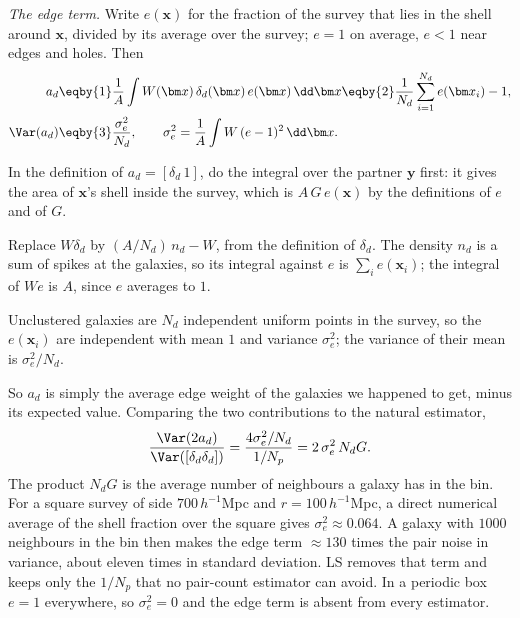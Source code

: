 \emph{The edge term.} Write $e(\bm x)$ for the fraction of the survey that lies in
the shell around $\bm x$, divided by its average over the survey; $e=1$ on
average, $e<1$ near edges and holes. Then
\begin{align}
  a_d&\eqby{1}\frac{1}{A}\int W(\bm x)\,\delta_d(\bm x)\,e(\bm x)\,\dd\bm x
     \eqby{2}\frac{1}{N_d}\sum_{i=1}^{N_d}e(\bm x_i)-1,\nonumber\\
  \Var(a_d)&\eqby{3}\frac{\sigma_e^2}{N_d},
  \qquad \sigma_e^2=\frac1A\int W\,(e-1)^2\,\dd\bm x .
  \label{11a:eq:ad-variance}
\end{align}
\begin{explain}
  \item In the definition of $a_d=[\delta_d\,1]$, do the integral over the partner
        $\bm y$ first: it gives the area of $\bm x$'s shell inside the survey,
        which is $A\,G\,e(\bm x)$ by the definitions of $e$ and of $G$.
  \item Replace $W\delta_d$ by $(A/N_d)\,n_d-W$, from the definition of
        $\delta_d$. The density $n_d$ is a sum of spikes at the galaxies, so its
        integral against $e$ is $\sum_ie(\bm x_i)$; the integral of $We$ is $A$,
        since $e$ averages to $1$.
  \item Unclustered galaxies are $N_d$ independent uniform points in the
        survey, so the $e(\bm x_i)$ are independent with mean $1$ and variance
        $\sigma_e^2$; the variance of their mean is $\sigma_e^2/N_d$.
\end{explain}
So $a_d$ is simply the average edge weight of the galaxies we happened to get,
minus its expected value. Comparing the two contributions to the natural
estimator,
\begin{equation}
  \frac{\Var(2a_d)}{\Var([\delta_d\delta_d])}
  =\frac{4\sigma_e^2/N_d}{1/N_p}
  =2\,\sigma_e^2\,N_dG .
  \label{11a:eq:edge-vs-pairs}
\end{equation}
The product $N_dG$ is the average number of neighbours a galaxy has in the bin.
For a square survey of side $700\,h^{-1}$Mpc and $r=100\,h^{-1}$Mpc, a direct
numerical average of the shell fraction over the square gives
$\sigma_e^2\approx0.064$. A galaxy with $1000$ neighbours in the bin then makes the
edge term $\approx130$ times the pair noise in variance, about eleven times in
standard deviation. LS removes that term and keeps only the $1/N_p$ that no
pair-count estimator can avoid. In a periodic box $e=1$ everywhere, so
$\sigma_e^2=0$ and the edge term is absent from every estimator.

